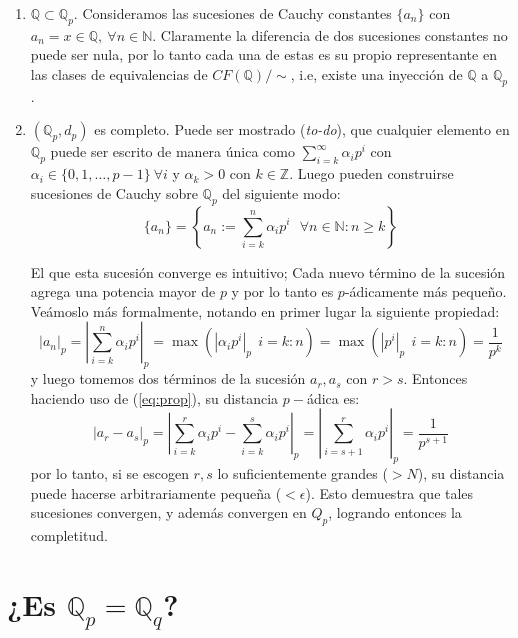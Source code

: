 \documentclass[spanish, fleqn]{article}
\begin{document}
\begin{enumerate}
    \item $\mathbb{Q} \subset \mathbb{Q}_p$. Consideramos las sucesiones de Cauchy constantes $\{a_n\}$ con $a_n = x \in \mathbb{Q},\  \forall n \in \mathbb{N}$. Claramente la diferencia de dos sucesiones constantes no puede ser nula, por lo tanto cada una de estas es su propio representante en las clases de equivalencias de $CF(\mathbb{Q})/\sim$, i.e, existe una inyección de $\mathbb{Q}$ a $\mathbb{Q}_p$.
    \item $(\mathbb{Q}_p, d_p)$ es completo. Puede ser mostrado (\textit{to-do}), que cualquier elemento en $\mathbb{Q}_p$ puede ser escrito de manera única como $ \displaystyle \sum_{i=k}^{\infty} \alpha_i p^{i} $
    con $\alpha_i \in \{0, 1, \ldots, p-1\} \ \forall i$ y $\alpha_k>0$ con $k \in \mathbb{Z}$. Luego pueden construirse sucesiones de Cauchy sobre $\mathbb{Q}_p$ del siguiente modo:
    \begin{equation*}
        \{a_n\} = \left\{ a_n := \sum_{i=k}^n \alpha_i p^i \ \ \ \forall n \in \mathbb{N}: n\geq k  \right\}
    \label{eq:suc}
    \end{equation*}

    El que esta sucesión converge es intuitivo; Cada nuevo término de la sucesión agrega una potencia mayor de $p$ y por lo tanto es $p$-ádicamente más pequeño. Veámoslo más formalmente, notando en primer lugar la siguiente propiedad:
    \begin{equation}
        |a_n|_p = \left| \sum_{i=k}^{n}\alpha_i p^i \right|_p = \max(|\alpha_i p^i|_p\ \ i=k:n) = \max(|p^i|_p\ \ i=k:n)=\frac{1}{p^k}
    \label{eq:prop}
    \end{equation}
    y luego tomemos dos términos de la sucesión $a_r, a_s$ con $r>s$. Entonces haciendo uso de (\ref{eq:prop}), su distancia $p-$ádica es:
    \begin{equation}
        |a_r - a_s|_p = \left| \sum_{i=k}^{r}\alpha_i p^i - \sum_{i=k}^{s}\alpha_i p^i \right|_p = \left| \sum_{i=s+1}^{r}\alpha_i p^i \right|_p = \frac{1}{p^{s+1}}
    \end{equation}
    por lo tanto, si se escogen $r,s$ lo suficientemente grandes ($>N$), su distancia puede hacerse arbitrariamente pequeña ($<\epsilon$). Esto demuestra que tales sucesiones convergen, y además convergen en $Q_p$, logrando entonces la completitud.
 
\end{enumerate}

\section{¿Es $\mathbb{Q}_p = \mathbb{Q}_q$?}
\end{document}
